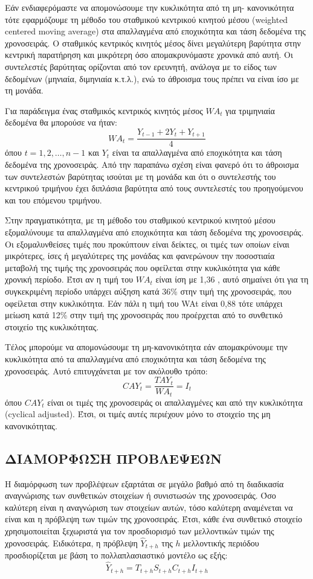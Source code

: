 Εάν ενδιαφερόμαστε να απομονώσουμε την κυκλικότητα από τη μη-
κανονικότητα τότε εφαρμόζουμε τη μέθοδο του σταθμικού κεντρικού κινητού μέσου
(weighted centered moving average) στα απαλλαγμένα από εποχικότητα και τάση
δεδομένα της χρονοσειράς. Ο σταθμικός κεντρικός κινητός μέσος δίνει μεγαλύτερη
βαρύτητα στην κεντρική παρατήρηση και μικρότερη όσο απομακρυνόμαστε χρονικά
από αυτή. Οι συντελεστές βαρύτητας ορίζονται από τον ερευνητή, ανάλογα με το
είδος των δεδομένων (μηνιαία, διμηνιαία κ.τ.λ.), ενώ το άθροισμα τους πρέπει να
είναι ίσο με τη μονάδα.

Για παράδειγμα ένας σταθμικός κεντρικός κινητός μέσος $WA_t$ για τριμηνιαία
δεδομένα θα μπορούσε να ήταν:\\
$$ WA_t=\frac{Y_{t-1}+2Y_t+Y_{t+1}}{4} $$
όπου $t = 1, 2,\ldots,n-1$ και $Y_t$ είναι τα απαλλαγμένα από εποχικότητα και τάση
δεδομένα της χρονοσειράς. Από την παραπάνω σχέση είναι φανερό ότι το άθροισμα
των συντελεστών βαρύτητας ισούται με τη μονάδα και ότι ο συντελεστής του
κεντρικού τριμήνου έχει διπλάσια βαρύτητα από τους συντελεστές του προηγούμενου
και του επόμενου τριμήνου.

Στην πραγματικότητα, με τη μέθοδο του σταθμικού κεντρικού κινητού μέσου
εξομαλύνουμε τα απαλλαγμένα από εποχικότητα και τάση δεδομένα της
χρονοσειράς. Οι εξομαλυνθείσες τιμές που προκύπτουν είναι δείκτες, οι τιμές των
οποίων είναι μικρότερες, ίσες ή μεγαλύτερες της μονάδας και φανερώνουν την
ποσοστιαία μεταβολή της τιμής της χρονοσειράς που οφείλεται στην κυκλικότητα για
κάθε χρονική περίοδο. Έτσι αν η τιμή του $WA_t$ είναι ίση με 1,36 , αυτό σημαίνει ότι
για τη συγκεκριμένη περίοδο υπάρχει αύξηση κατά 36\% στην τιμή της χρονοσειράς,
που οφείλεται στην κυκλικότητα. Εάν πάλι η τιμή του WAt είναι 0,88 τότε υπάρχει
μείωση κατά 12\% στην τιμή της χρονοσειράς που προέρχεται από το συνθετικό
στοιχείο της κυκλικότητας.

Τέλος μπορούμε να απομονώσουμε τη μη-κανονικότητα εάν απομακρύνουμε την
κυκλικότητα από τα απαλλαγμένα από εποχικότητα και τάση δεδομένα της
χρονοσειράς. Αυτό επιτυγχάνεται με τον ακόλουθο τρόπο:\\
$$ CAY_t=\frac{TAY_t}{WA_t}=I_t $$
όπου $CAY_t$ είναι οι τιμές της χρονοσειράς οι απαλλαγμένες και από την κυκλικότητα
(cyclical adjusted). Έτσι, οι τιμές αυτές περιέχουν μόνο το στοιχείο της μη
κανονικότητας.
\subsection{ΔΙΑΜΟΡΦΩΣΗ ΠΡΟΒΛΕΨΕΩΝ}
Η διαμόρφωση των προβλέψεων εξαρτάται σε μεγάλο βαθμό από τη διαδικασία
αναγνώρισης των συνθετικών στοιχείων ή συνιστωσών της χρονοσειράς. Όσο
καλύτερη είναι η αναγνώριση των στοιχείων αυτών, τόσο καλύτερη αναμένεται να
είναι και η πρόβλεψη των τιμών της χρονοσειράς. Έτσι, κάθε ένα συνθετικό στοιχείο
χρησιμοποιείται ξεχωριστά για τον προσδιορισμό των μελλοντικών τιμών της
χρονοσειράς. Ειδικότερα, η πρόβλεψη $\widehat{Y}_{t+h}$ της $h$ μελλοντικής περιόδου
προσδιορίζεται με βάση το πολλαπλασιαστικό μοντέλο ως εξής:\\
$$ \widehat{Y}_{t+h}=T_{t+h}S_{t+h}C_{t+h}I_{t+h} $$

